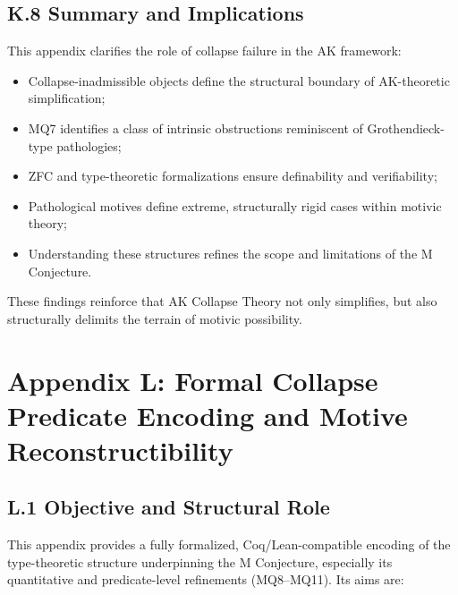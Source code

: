 \documentclass[11pt]{article}
\begin{document}
\subsection*{K.8 Summary and Implications}

This appendix clarifies the role of collapse failure in the AK framework:

\begin{itemize}
    \item Collapse-inadmissible objects define the structural boundary of AK-theoretic simplification;
    \item MQ7 identifies a class of intrinsic obstructions reminiscent of Grothendieck-type pathologies;
    \item ZFC and type-theoretic formalizations ensure definability and verifiability;
    \item Pathological motives define extreme, structurally rigid cases within motivic theory;
    \item Understanding these structures refines the scope and limitations of the M Conjecture.
\end{itemize}

These findings reinforce that AK Collapse Theory not only simplifies, but also structurally delimits the terrain of motivic possibility.

\FloatBarrier




\section*{Appendix L: Formal Collapse Predicate Encoding and Motive Reconstructibility}

\subsection*{L.1 Objective and Structural Role}

This appendix provides a fully formalized, Coq/Lean-compatible encoding of the type-theoretic structure underpinning the M Conjecture, especially its quantitative and predicate-level refinements (MQ8–MQ11). Its aims are:
\end{document}
